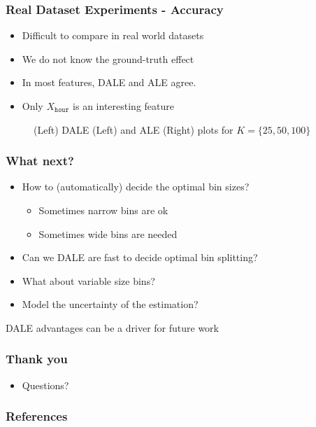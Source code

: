 \documentclass{beamer}
\begin{document}
\begin{frame}
  \frametitle{Real Dataset Experiments - Accuracy}
  \begin{itemize}
  \item Difficult to compare in real world datasets
   \item We do not know the ground-truth effect
   \item In most features, DALE and ALE agree.
   \item Only \(X_{\mathtt{hour}}\) is an interesting feature
  \end{itemize}

  \begin{figure}[h]
  \centering
    \resizebox{.3\columnwidth}{!}{}
    \resizebox{.3\columnwidth}{!}{}
    \caption{(Left) DALE (Left) and ALE (Right) plots for
      \(K = \{25, 50, 100\}\)}
\end{figure}

\end{frame}

\begin{frame}
  \frametitle{What next?}
  \begin{itemize}
  \item How to (automatically) decide the optimal bin sizes?
    \begin{itemize}
      \item Sometimes narrow bins are ok
      \item Sometimes wide bins are needed
      \end{itemize}
    \item Can we DALE are fast to decide optimal bin splitting?
    \item What about variable size bins?
      \item Model the uncertainty of the estimation?
  \end{itemize}

  \noindent\makebox[\linewidth]{\rule{\paperwidth}{0.4pt}}
  DALE advantages can be a driver for future work
\end{frame}


\begin{frame}
  \frametitle{Thank you}
  \begin{itemize}
  \item Questions?
  \end{itemize}

\end{frame}



\begin{frame}[allowframebreaks]
  \frametitle{References}
  
\end{frame}
\end{document}
